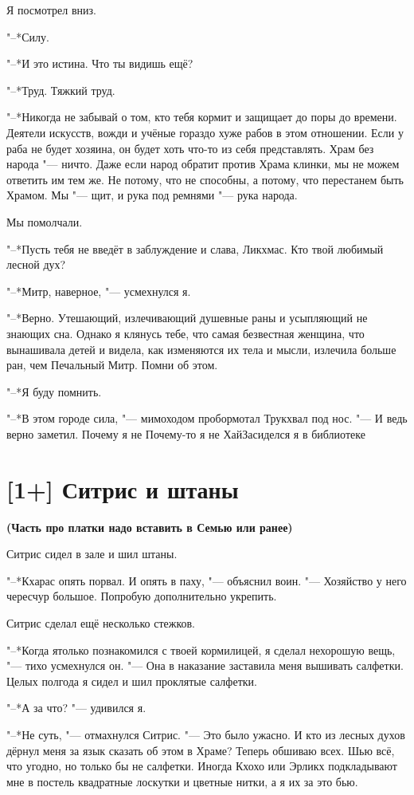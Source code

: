 Я посмотрел вниз.

"--*Силу.

"--*И это истина.
Что ты видишь ещё?

"--*Труд.
Тяжкий труд.

"--*Никогда не забывай о том, кто тебя кормит и защищает до поры до времени.
Деятели искусств, вожди и учёные гораздо хуже рабов в этом отношении.
Если у раба не будет хозяина, он будет хоть что-то из себя представлять.
Храм без народа "--- ничто.
Даже если народ обратит против Храма клинки, мы не можем ответить им тем же.
Не потому, что не способны, а потому, что перестанем быть Храмом.
Мы "--- щит, и рука под ремнями "--- рука народа.

Мы помолчали.

"--*Пусть тебя не введёт в заблуждение и слава, Ликхмас.
Кто твой любимый лесной дух?

"--*Митр, наверное, "--- усмехнулся я.

"--*Верно.
Утешающий, излечивающий душевные раны и усыпляющий не знающих сна.
Однако я клянусь тебе, что самая безвестная женщина, что вынашивала детей и видела, как изменяются их тела и мысли, излечила больше ран, чем Печальный Митр.
Помни об этом.

"--*Я буду помнить.

"--*В этом городе сила, "--- мимоходом пробормотал Трукхвал под нос.
"--- И ведь верно заметил.
Почему я не\ldotsq
Почему-то я не\ldotst
Хай\ldotst Засиделся я в библиотеке\ldotst

\section{[1+] Ситрис и штаны}

\textbf{(Часть про платки надо вставить в Семью или ранее)}

Ситрис сидел в зале и шил штаны.

"--*Кхарас опять порвал.
И опять в паху, "--- объяснил воин.
"--- Хозяйство у него чересчур большое.
Попробую дополнительно укрепить.

Ситрис сделал ещё несколько стежков.

"--*Когда я\ldotst только познакомился с твоей кормилицей, я сделал нехорошую вещь, "--- тихо усмехнулся он.
"--- Она в наказание заставила меня вышивать салфетки.
Целых полгода я сидел и шил проклятые салфетки.

"--*А за что? "--- удивился я.

"--*Не суть, "--- отмахнулся Ситрис.
"--- Это было ужасно.
И кто из лесных духов дёрнул меня за язык сказать об этом в Храме?
Теперь обшиваю всех.
Шью всё, что угодно, но только бы не салфетки.
Иногда Кхохо или Эрликх подкладывают мне в постель квадратные лоскутки и цветные нитки, а я их за это бью.

